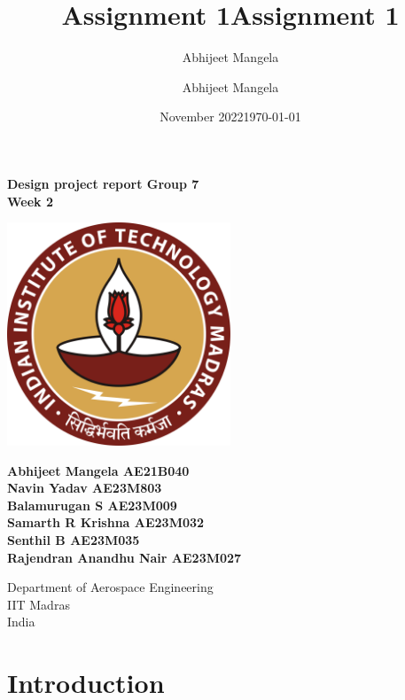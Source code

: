 \documentclass[12 pt]{article}
\title{Assignment 1}
\author{Abhijeet Mangela}
\date{November 2022}
\title{Assignment 1}
\author{Abhijeet Mangela}
\date{\today}
\begin{document}
\begin{titlepage}
\begin{center}

\textbf{\huge Design project report Group 7 \\ \vspace{0.4 cm} Week 2} \\

\vspace{2 cm}

\centering
\includegraphics[width=0.5\textwidth]{IIT_Madras_Logo.svg.png}
\label{fig:my_label}

\vspace{1cm}

\textbf{Abhijeet Mangela AE21B040 \\ Navin Yadav AE23M803 \\ Balamurugan S AE23M009 \\ Samarth R Krishna AE23M032 \\ Senthil B AE23M035 \\ Rajendran Anandhu Nair AE23M027 }

\vspace{0.5cm}

\footnotesize Department of Aerospace Engineering \\
IIT Madras \\
India

\normalsize

\end{center}
\end{titlepage}


\newpage

\tableofcontents

\newpage

\section{Introduction}
\end{document}
